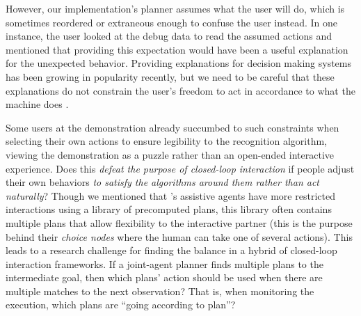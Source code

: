 \documentclass[letterpaper]{article} %
\begin{document}
However, our implementation's planner assumes what the user will do, which is sometimes reordered or extraneous enough to confuse the user instead.  In one instance, the user looked at the debug data to read the assumed actions and mentioned that providing this expectation would have been a useful explanation for the unexpected behavior.  Providing explanations for decision making systems \cite{xaip} has been growing in popularity recently, but we need to be careful that these explanations do not constrain the user's freedom to act in accordance to what the machine does \cite{DBLP:conf/aaaifs/CastroRMB17}.

Some users at the demonstration already succumbed to such constraints when selecting their own actions to ensure legibility to the recognition algorithm, viewing the demonstration as a puzzle rather than an open-ended interactive experience.  Does this \textit{defeat the purpose of closed-loop interaction} if people adjust their own behaviors \textit{to satisfy the algorithms around them rather than act naturally}?  Though we mentioned that \citeauthor{jair_levineWilliams}'s  assistive agents have more restricted interactions using %
 a library of precomputed plans, this library often contains multiple plans that allow flexibility to the interactive partner (this is the purpose behind their \textit{choice nodes} where the human can take one of several actions).  This leads to a research challenge for finding the balance in a hybrid of closed-loop interaction frameworks.  If a joint-agent planner finds multiple plans to the intermediate goal, then which plans' action should be used when there are multiple matches to the next observation?  That is, when monitoring the execution, which plans are ``going according to plan''?




\end{document}
